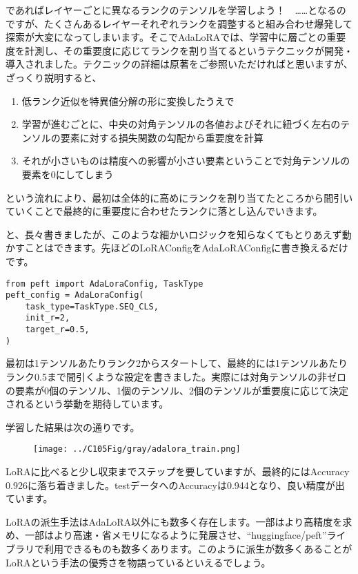 \documentclass[a5paper,twoside,dvipdfmx]{jsarticle}
\begin{document}
であればレイヤーごとに異なるランクのテンソルを学習しよう！　……となるのですが、たくさんあるレイヤーそれぞれランクを調整すると組み合わせ爆発して探索が大変になってしまいます。そこでAdaLoRAでは、学習中に層ごとの重要度を計測し、その重要度に応じてランクを割り当てるというテクニックが開発・導入されました。テクニックの詳細は原著をご参照いただければと思いますが、ざっくり説明すると、

\begin{enumerate}
  \item 低ランク近似を特異値分解の形に変換したうえで
  \item 学習が進むごとに、中央の対角テンソルの各値およびそれに紐づく左右のテンソルの要素に対する損失関数の勾配から重要度を計算
  \item それが小さいものは精度への影響が小さい要素ということで対角テンソルの要素を0にしてしまう
\end{enumerate}

という流れにより、最初は全体的に高めにランクを割り当てたところから間引いていくことで最終的に重要度に合わせたランクに落とし込んでいきます。

と、長々書きましたが、このような細かいロジックを知らなくてもとりあえず動かすことはできます。先ほどのLoRAConfigをAdaLoRAConfigに書き換えるだけです。

\begin{lstlisting}
from peft import AdaLoraConfig, TaskType
peft_config = AdaLoraConfig(
    task_type=TaskType.SEQ_CLS,
    init_r=2,
    target_r=0.5,
)
\end{lstlisting}

最初は1テンソルあたりランク2からスタートして、最終的には1テンソルあたりランク0.5まで間引くような設定を書きました。実際には対角テンソルの非ゼロの要素が0個のテンソル、1個のテンソル、2個のテンソルが重要度に応じて決定されるという挙動を期待しています。

学習した結果は次の通りです。


\begin{figure}[h]
  \centering
  \texttt{[image: ../C105Fig/gray/adalora\_train.png]}
 \end{figure} 

LoRAに比べると少し収束までステップを要していますが、最終的にはAccuracy 0.926に落ち着きました。testデータへのAccuracyは0.944となり、良い精度が出ています。

LoRAの派生手法はAdaLoRA以外にも数多く存在します。一部はより高精度を求め、一部はより高速・省メモリになるように発展させ、``huggingface/peft''ライブラリで利用できるものも数多くあります。このように派生が数多くあることがLoRAという手法の優秀さを物語っているといえるでしょう。
\end{document}
